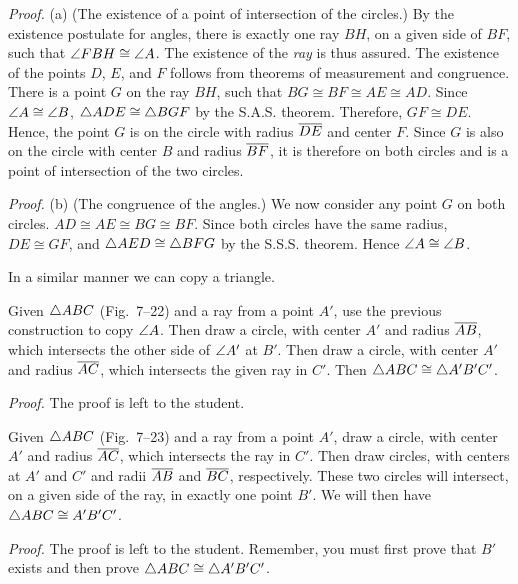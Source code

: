 \documentclass[11pt]{book}
\begin{document}
\noindent\emph{Proof.} (a)\quad
(The existence of a point of intersection of the circles.) By the existence
postulate for angles, there is exactly one ray $BH$, on a given side of $BF$,
such that $\angle FBH \cong \angle A$. The existence of the \emph{ray} is thus
assured. The existence of the points $D$, $E$, and $F$ follows from theorems of
measurement and congruence. There is a point $G$ on the ray $BH$, such that
$BG \cong BF \cong AE \cong AD$. Since $\angle A \cong \angle B$,
$\triangle ADE \cong \triangle BGF$ by the S.A.S. theorem. Therefore,
$GF \cong DE$. Hence, the point $G$ is on the circle with radius $\overline{DE}$ and
center $F$. Since $G$ is also on the circle with center $B$ and radius
$\overline{BF}$, it is therefore on both circles and is a point of intersection of
the two circles.

\noindent\emph{Proof.} (b)\quad
(The congruence of the angles.) We now consider any point $G$ on both circles.
$AD \cong AE \cong BG \cong BF$. Since both circles have the same radius,
$DE \cong GF$, and $\triangle AED \cong \triangle BFG$ by the S.S.S. theorem. Hence
$\angle A \cong \angle B$.

In a similar manner we can copy a triangle.

\begin{construction}
Given $\triangle ABC$ (Fig.~7--22) and a ray from a point $A'$, use the previous
construction to copy $\angle A$. Then draw a circle, with center $A'$ and radius
$\overline{AB}$, which intersects the other side of $\angle A'$ at $B'$. Then draw a
circle, with center $A'$ and radius $\overline{AC}$, which intersects the given ray
in $C'$. Then $\triangle ABC \cong \triangle A'B'C'$.
\end{construction}

\noindent\emph{Proof.}\quad
The proof is left to the student.

\FIGVIITWENTYTWOTWENTYTHREE

\begin{construction}
Given $\triangle ABC$ (Fig.~7--23) and a ray from a point $A'$, draw a circle, with
center $A'$ and radius $\overline{AC}$, which intersects the ray in $C'$. Then draw
circles, with centers at $A'$ and $C'$ and radii $\overline{AB}$ and $\overline{BC}$,
respectively. These two circles will intersect, on a given side of the ray, in
exactly one point $B'$. We will then have $\triangle ABC \cong A'B'C'$.
\end{construction}

\noindent\emph{Proof.}\quad
The proof is left to the student. Remember, you must first prove that $B'$
exists and then prove $\triangle ABC \cong \triangle A'B'C'$.
\end{document}
